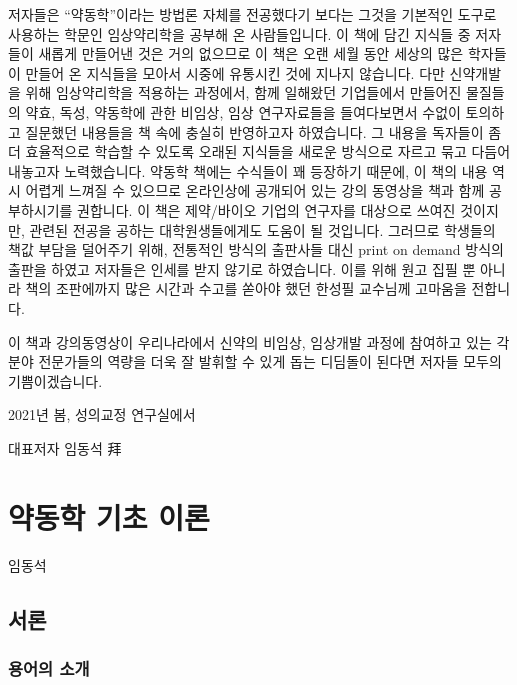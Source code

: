 \documentclass[
  11pt,
  krantz2, a4paper, twoside]{krantz}
\theoremstyle{definition}
\theoremstyle{definition}
\theoremstyle{definition}
\theoremstyle{definition}
\theoremstyle{remark}
\begin{document}
저자들은 ``약동학''이라는 방법론 자체를 전공했다기 보다는 그것을 기본적인
도구로 사용하는 학문인 임상약리학을 공부해 온 사람들입니다. 이 책에 담긴
지식들 중 저자들이 새롭게 만들어낸 것은 거의 없으므로 이 책은 오랜 세월
동안 세상의 많은 학자들이 만들어 온 지식들을 모아서 시중에 유통시킨 것에
지나지 않습니다. 다만 신약개발을 위해 임상약리학을 적용하는 과정에서,
함께 일해왔던 기업들에서 만들어진 물질들의 약효, 독성, 약동학에 관한
비임상, 임상 연구자료들을 들여다보면서 수없이 토의하고 질문했던 내용들을
책 속에 충실히 반영하고자 하였습니다. 그 내용을 독자들이 좀 더
효율적으로 학습할 수 있도록 오래된 지식들을 새로운 방식으로 자르고 묶고
다듬어 내놓고자 노력했습니다. 약동학 책에는 수식들이 꽤 등장하기 때문에,
이 책의 내용 역시 어렵게 느껴질 수 있으므로 온라인상에 공개되어 있는
강의 동영상을 책과 함께 공부하시기를 권합니다.
이 책은 제약/바이오 기업의 연구자를 대상으로 쓰여진 것이지만, 관련된 전공을 공하는 대학원생들에게도 도움이 될 것입니다.
그러므로 학생들의 책값 부담을 덜어주기 위해, 전통적인 방식의 출판사들 대신 print on demand 방식의 출판을 하였고 저자들은 인세를 받지 않기로 하였습니다.
이를 위해 원고 집필 뿐 아니라 책의 조판에까지 많은 시간과 수고를 쏟아야 했던 한성필 교수님께 고마움을 전합니다.

이 책과 강의동영상이
우리나라에서 신약의 비임상, 임상개발 과정에 참여하고 있는 각 분야
전문가들의 역량을 더욱 잘 발휘할 수 있게 돕는 디딤돌이 된다면 저자들
모두의 기쁨이겠습니다.

\hfill 2021년 봄, 성의교정 연구실에서

\hfill 대표저자 임동석 拜

\normalsize

\mainmatter

\hypertarget{principle}{%
\chapter{약동학 기초 이론}\label{principle}}

\Large\hfill

임동석
\normalsize

\hypertarget{uxc11cuxb860}{%
\section{서론}\label{uxc11cuxb860}}

\hypertarget{uxc6a9uxc5b4uxc758-uxc18cuxac1c}{%
\subsection{용어의 소개}\label{uxc6a9uxc5b4uxc758-uxc18cuxac1c}}
\end{document}
